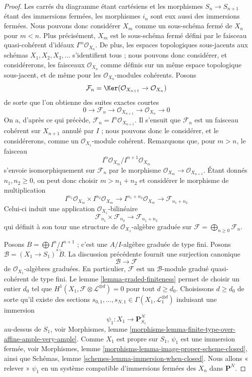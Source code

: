 \begin{proof}
Les carrés du diagramme étant cartésiens et les morphismes
$S_n \to S_{n + 1}$ étant des immersions fermées, les morphismes
$i_n$ sont eux aussi des immersions fermées. Nous pouvons donc considérer
$X_m$ comme un sous-schéma fermé de $X_n$ pour $m < n$. Plus précisément, $X_m$ est
le sous-schéma fermé défini par le faisceau quasi-cohérent d'idéaux
$I^m\mathcal{O}_{X_n}$. De plus, les espaces topologiques
sous-jacents aux schémas $X_1, X_2, X_3, \ldots$ s'identifient tous ; nous pouvons
donc considérer, et considérerons, les faisceaux $\mathcal{O}_{X_n}$ comme définis sur un même
espace topologique sous-jacent, et de même pour les
$\mathcal{O}_{X_n}$-modules cohérents. Posons
$$
\mathcal{F}_n =
\Ker(\mathcal{O}_{X_{n + 1}} \to \mathcal{O}_{X_n})
$$
de sorte que l'on obtienne des suites exactes courtes
$$
0 \to \mathcal{F}_n \to \mathcal{O}_{X_{n + 1}} \to \mathcal{O}_{X_n} \to 0
$$
On a, d'après ce qui précède, $\mathcal{F}_n = I^n\mathcal{O}_{X_{n + 1}}$.
Il s'ensuit que $\mathcal{F}_n$ est un faisceau cohérent sur $X_{n + 1}$
annulé par $I$ ; nous pouvons donc le considérer, et le considérerons, comme
un $\mathcal{O}_{X_1}$-module cohérent. Remarquons que, pour $m > n$, le faisceau
$$
I^n\mathcal{O}_{X_m}/I^{n + 1}\mathcal{O}_{X_m}
$$
s'envoie isomorphiquement sur $\mathcal{F}_n$ par le morphisme
$\mathcal{O}_{X_m} \to \mathcal{O}_{X_{n + 1}}$. Étant donnés
$n_1, n_2 \geq 0$, on peut donc choisir $m > n_1 + n_2$ et considérer le morphisme
de multiplication
$$
I^{n_1}\mathcal{O}_{X_m} \times I^{n_2}\mathcal{O}_{X_m}
\longrightarrow
I^{n_1 + n_2}\mathcal{O}_{X_m} \to \mathcal{F}_{n_1 + n_2}
$$
Celui-ci induit une application $\mathcal{O}_{X_1}$-bilinéaire
$$
\mathcal{F}_{n_1} \times \mathcal{F}_{n_2} \longrightarrow
\mathcal{F}_{n_1 + n_2}
$$
qui définit à son tour une structure de $\mathcal{O}_{X_1}$-algèbre graduée
sur $\mathcal{F} = \bigoplus_{n \geq 0} \mathcal{F}_n$.

\medskip\noindent
Posons $B = \bigoplus I^n/I^{n + 1}$ ; c'est
une $A/I$-algèbre graduée de type fini. Posons $\mathcal{B} = (X_1 \to S_1)^*\widetilde{B}$.
La discussion précédente fournit une surjection canonique
$$
\mathcal{B} \longrightarrow \mathcal{F}
$$
de $\mathcal{O}_{X_1}$-algèbres graduées. En particulier,
$\mathcal{F}$ est un $\mathcal{B}$-module gradué quasi-cohérent
de type fini. Le lemme \ref{lemma-graded-finiteness} permet de choisir un entier $d_0$
tel que $H^1(X_1, \mathcal{F} \otimes \mathcal{L}^{\otimes d}) = 0$
pour tout $d \geq d_0$. Choisissons $d \geq d_0$ de sorte qu'il existe des sections
$s_{0, 1}, \ldots, s_{N, 1} \in \Gamma(X_1, \mathcal{L}_1^{\otimes d})$
induisant une immersion
$$
\psi_1 : X_1 \to \mathbf{P}^N_{S_1}
$$
au-dessus de $S_1$, voir
Morphismes, lemme \ref{morphisms-lemma-finite-type-over-affine-ample-very-ample}.
Comme $X_1$ est propre sur $S_1$, $\psi_1$
est une immersion fermée, voir
Morphismes, lemme \ref{morphisms-lemma-image-proper-scheme-closed},
ainsi que
Schémas, lemme \ref{schemes-lemma-immersion-when-closed}.
Nous allons « relever » $\psi_1$ en un système compatible
d'immersions fermées des $X_n$ dans $\mathbf{P}^N$.


\end{proof}
